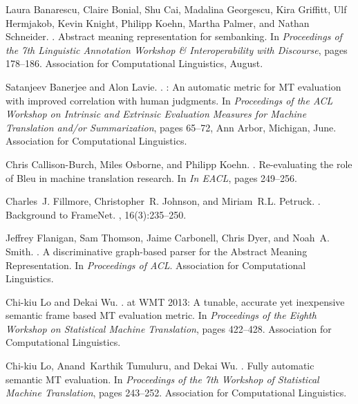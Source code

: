 \documentclass[11pt,twocolumn]{article}
\begin{document}
\begin{thebibliography}{}

Laura Banarescu, Claire Bonial, Shu Cai, Madalina Georgescu, Kira Griffitt, Ulf
  Hermjakob, Kevin Knight, Philipp Koehn, Martha Palmer, and Nathan Schneider.
.
\newblock Abstract meaning representation for sembanking.
\newblock In {\em Proceedings of the 7th Linguistic Annotation Workshop \&
  Interoperability with Discourse}, pages 178--186. Association for
  Computational Linguistics, August.

Satanjeev Banerjee and Alon Lavie.
.
: An automatic metric for {MT} evaluation with improved
  correlation with human judgments.
\newblock In {\em Proceedings of the ACL Workshop on Intrinsic and Extrinsic
  Evaluation Measures for Machine Translation and/or Summarization}, pages
  65--72, Ann Arbor, Michigan, June. Association for Computational Linguistics.

Chris Callison-Burch, Miles Osborne, and Philipp Koehn.
.
\newblock Re-evaluating the role of {Bleu} in machine translation research.
\newblock In {\em In {EACL}}, pages 249--256.

Charles~J. Fillmore, Christopher~R. Johnson, and Miriam~R.L. Petruck.
.
\newblock Background to {FrameNet}.
, 16(3):235--250.

Jeffrey Flanigan, Sam Thomson, Jaime Carbonell, Chris Dyer, and Noah~A. Smith.
.
\newblock A discriminative graph-based parser for the {Abstract Meaning
  Representation}.
\newblock In {\em Proceedings of {ACL}}. Association for Computational
  Linguistics.

Chi{-}kiu Lo and Dekai Wu.
.
 at {WMT} 2013: A tunable, accurate yet inexpensive semantic
  frame based {MT} evaluation metric.
\newblock In {\em Proceedings of the Eighth Workshop on Statistical Machine
  Translation}, pages 422--428. Association for Computational Linguistics.

Chi{-}kiu Lo, Anand~Karthik Tumuluru, and Dekai Wu.
.
\newblock Fully automatic semantic {MT} evaluation.
\newblock In {\em Proceedings of the 7th Workshop of Statistical Machine
  Translation}, pages 243--252. Association for Computational Linguistics.


\end{thebibliography}
\end{document}
